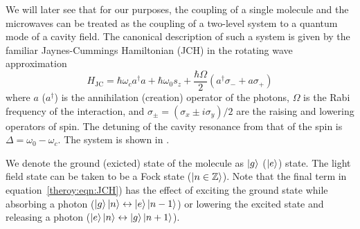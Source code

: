 We will later see that for our purposes, the coupling of a single molecule and
the microwaves can be treated as the coupling of a two-level system to a quantum
mode of a cavity field. The canonical description of such a system is given by
the familiar Jaynes-Cummings Hamiltonian (JCH) in the rotating wave
approximation~\cite{gerry_knight_2004}
%
\begin{equation}
  H_\text{JC} = \hbar\omega_c a^\dagger a + \hbar \omega_0 s_z +
  \frac{\hbar\Omega}{2}(a^\dagger \sigma_- + a\sigma_+)
  \label{theory:eqn:JCH}
\end{equation}
%
where $a$ ($a^\dagger$) is the annihilation (creation) operator of the photons,
$\Omega$ is the Rabi frequency of the interaction, and $\sigma_\pm =
(\sigma_x \pm i\sigma_y)/2$ are the raising and lowering operators of spin. The
detuning of the cavity resonance from that of the spin is $\Delta = \omega_0 -
\omega_c$. The system is shown in .

\begin{figure}
  \caption{}
  \label{theory:fig:JCHstates}
\end{figure}

We denote the ground (exicted) state of the molecule as $\ket{g}$ ($\ket{e}$)
state. The light field state can be taken to be a Fock state ($\ket{n \in
\mathbb{Z}}$). Note that the final term in equation~\ref{theroy:eqn:JCH}) has
the effect of exciting the ground state while absorbing a photon
($\ket{g}\ket{n} \leftrightarrow \ket{e}\ket{n-1}$) or lowering the excited state
and releasing a photon ($\ket{e}\ket{n} \leftrightarrow \ket{g}\ket{n+1}$).

